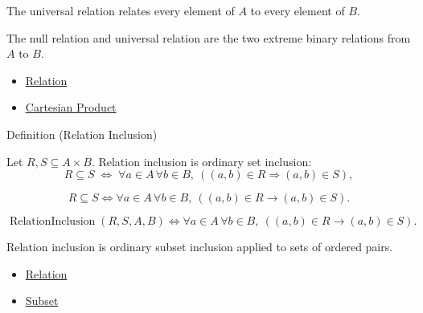 \begin{remark*}[Interpretation]
The universal relation relates every element of $A$ to every element of $B$.
\end{remark*}

\begin{remark*}[Exposition]
The null relation and universal relation are the two extreme binary relations
from $A$ to $B$.
\end{remark*}

\begin{dependencies}
\begin{itemize}
  \item \hyperref[def:relation]{Relation}
  \item \hyperref[def:cartesian-product-rel]{Cartesian Product}
\end{itemize}
\end{dependencies}

\begin{definitionbox}{Definition (Relation Inclusion)}
\begin{definition}\label{def:relation-inclusion}
Let $R,S\subseteq A\times B$. Relation inclusion is ordinary set inclusion:
\[
R\subseteq S
\;\Longleftrightarrow\;
\forall a\in A\,\forall b\in B,\ ((a,b)\in R\Rightarrow (a,b)\in S),
\]
\end{definition}
\end{definitionbox}

\begin{remark*}
\[
  R\subseteq S
  \iff
  \forall a\in A\,\forall b\in B,\ ((a,b)\in R\to(a,b)\in S).
\]
\end{remark*}

\begin{remark*}
\[
  \operatorname{RelationInclusion}(R,S,A,B)
  \iff
  \forall a\in A\,\forall b\in B,\ ((a,b)\in R\to(a,b)\in S).
\]
\end{remark*}

\begin{remark*}[Interpretation]
Relation inclusion is ordinary subset inclusion applied to sets of ordered
pairs.
\end{remark*}

\begin{dependencies}
\begin{itemize}
  \item \hyperref[def:relation]{Relation}
  \item \hyperref[def:subset]{Subset}
\end{itemize}
\end{dependencies}

